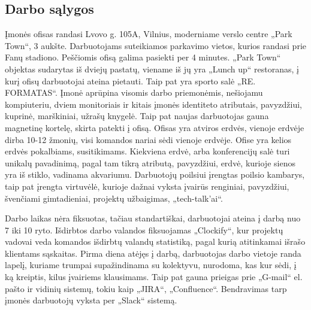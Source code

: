 \subsection{Darbo sąlygos}
Įmonės ofisas randasi Lvovo g. 105A, Vilnius, moderniame verslo centre „Park Town“, 3 aukšte. Darbuotojams suteikiamos parkavimo vietos, kurios randasi prie Fanų stadiono.
Peščiomis ofisą galima pasiekti per 4 minutes. „Park Town“ objektas sudarytas iš dviejų pastatų, viename iš jų yra „Lunch up“ restoranas, į kurį ofisų darbuotojai ateina pietauti.
Taip pat yra sporto salė „RE. FORMATAS“. Įmonė aprūpina visomis darbo priemonėmis, nešiojamu kompiuteriu, dviem monitoriais ir kitais įmonės identiteto atributais, pavyzdžiui,
kuprinė, marškiniai, užrašų knygelė. Taip pat naujas darbuotojas gauna magnetinę kortelę, skirta patekti į ofisą.
Ofisas yra atviros erdvės, vienoje erdvėje dirba 10-12 žmonių, visi komandos nariai sėdi vienoje erdvėje.
Ofise yra kelios erdvės pokalbiams, susitikimams. Kiekviena erdvė, arba konferencijų salė turi unikalų pavadinimą, pagal tam tikrą atributą, pavyzdžiui,
erdvė, kurioje sienos yra iš stiklo, vadinama akvariumu. Darbuotojų poilsiui įrengtas poilsio kambarys, taip pat įrengta virtuvėlė,
kurioje dažnai vyksta įvairūs renginiai, pavyzdžiui, švenčiami gimtadieniai, projektų užbaigimas, „tech-talk'ai“.

Darbo laikas nėra fiksuotas, tačiau standartiškai, darbuotojai ateina į darbą nuo 7 iki 10 ryto. Išdirbtos darbo valandos fiksuojamas „Clockify“, kur projektų vadovai veda
komandos išdirbtų valandų statistiką, pagal kurią atitinkamai išrašo klientams sąskaitas.
Pirma diena atėjęs į darbą, darbuotojas darbo vietoje randa lapelį, kuriame trumpai supažindinama su kolektyvu, nurodoma, kas kur sėdi, į ką kreiptis, kilus įvairiems klausimams.
Taip pat gauna prieigas prie „G-mail“ el. pašto ir vidinių sistemų, tokiu kaip „JIRA“, „Confluence“. Bendravimas tarp įmonės darbuotojų vyksta per „Slack“ sistemą.
